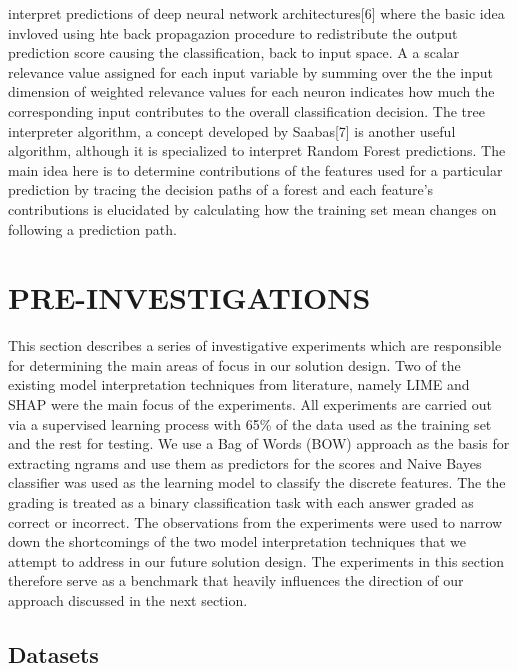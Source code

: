 \documentclass[letterpaper, 10 pt, conference]{ieeeconf}  %
\begin{document}
interpret predictions of deep neural network architectures[6] where the basic idea invloved using hte back propagazion procedure to redistribute the output prediction score causing the classification, back to input space. A a scalar relevance value assigned for each input variable by summing over the the input dimension of weighted relevance values for each neuron indicates how much the corresponding input contributes to the overall classification decision. The tree interpreter algorithm, a concept developed by Saabas[7] is another useful algorithm, although it is specialized to interpret Random Forest predictions. The main idea here is to determine contributions of the features used for a particular prediction by tracing the decision paths of a forest and each feature's contributions is elucidated by calculating how the training set mean changes on following a prediction path.

\section{PRE-INVESTIGATIONS}

This section describes a series of investigative experiments which are responsible for determining the main areas of focus in our solution design. Two of the existing model interpretation techniques from literature, namely LIME and SHAP were the main focus of the experiments. All experiments are carried out via a supervised learning process with 65\% of the data used as the training set and the rest for testing. We use a Bag of Words (BOW) approach as the basis for extracting ngrams and use them as predictors for the scores and Naive Bayes classifier was used as the learning model to classify the discrete features. The the grading is treated as a binary classification task with each answer graded as correct or incorrect. The observations from the experiments were used to narrow down the shortcomings of the two model interpretation techniques that we attempt to address in our future solution design. The experiments in this section therefore serve as a benchmark that heavily influences the direction of our approach discussed in the next section.

\subsection{Datasets} 
\end{document}
